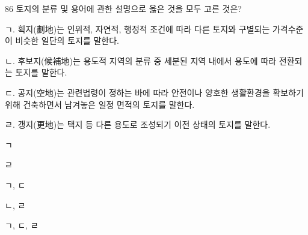 \begin{question}{86}
토지의 분류 및 용어에 관한 설명으로 옳은 것을 모두 고른 것은?
\begin{framedtext}
ㄱ. 획지(劃地)는 인위적, 자연적, 행정적 조건에 따라 다른 토지와 구별되는 가격수준이 비슷한 일단의 토지를 말한다. \par
ㄴ. 후보지(候補地)는 용도적 지역의 분류 중 세분된 지역 내에서 용도에 따라 전환되는 토지를 말한다. \par
ㄷ. 공지(空地)는 관련법령이 정하는 바에 따라 안전이나 양호한 생활환경을 확보하기 위해 건축하면서 남겨놓은 일정 면적의 토지를 말한다. \par
ㄹ. 갱지(更地)는 택지 등 다른 용도로 조성되기 이전 상태의 토지를 말한다. \par
\end{framedtext}
\begin{choices}
  \item ㄱ
  \item ㄹ
  \item ㄱ, ㄷ
  \item ㄴ, ㄹ
  \item ㄱ, ㄷ, ㄹ
\end{choices}
\end{question}
